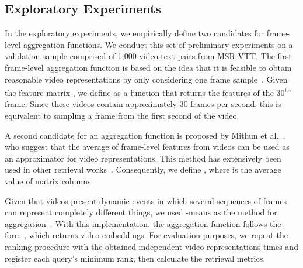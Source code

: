 \documentclass[a4paper,runningheads]{llncs}
\begin{document}
\subsection{Exploratory Experiments}
\label{sec:ExploratoryExperiments}

In the exploratory experiments, we empirically define two candidates for frame-level aggregation  functions. We conduct this set of preliminary experiments on a validation sample comprised of 1,000 video-text pairs from MSR-VTT. The first frame-level aggregation function is based on the idea that it is feasible to obtain reasonable video representations by only considering one frame sample~\cite{karpathy2014large}. Given the feature matrix , we define  as a function that returns the features of the 30\textsuperscript{th} frame. Since these videos contain approximately 30 frames per second, this is equivalent to sampling a frame from the first second of the video. 

A second candidate for an aggregation function is proposed by Mithun et al.~\cite{Mithun2018MultimodalCuesVSE}, who suggest that the average of frame-level features from videos can be used as an approximator for video representations. This method has extensively been used in other retrieval works~\cite{Gabeur2020MMT,Liu2020CE,Miech2020end,Miech2019HTM100,Patrick2021supportset}. Consequently, we define , where  is the average value of matrix columns.

Given that videos present dynamic events in which several sequences of frames can represent completely different things, we used -means as the method for aggregation~\cite{sun2019videobert}. With this implementation, the aggregation function follows the form , which returns  video embeddings. For evaluation purposes, we repeat the ranking procedure with the obtained independent video representations  times and register each query's minimum rank, then calculate the retrieval metrics. 
\end{document}
